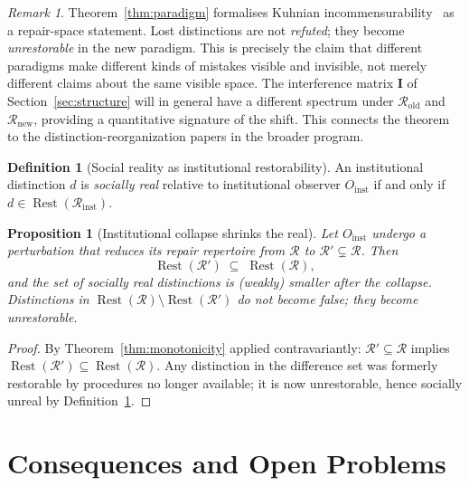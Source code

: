 \documentclass[12pt, oneside]{article}
\theoremstyle{plain}
\newtheorem{proposition}[theorem]{Proposition}
\theoremstyle{definition}
\newtheorem{definition}[theorem]{Definition}
\theoremstyle{remark}
\newtheorem{remark}[theorem]{Remark}
\theoremstyle{definition}
\DeclareMathOperator{\Rest}{Rest}
\newcommand{\IntMat}{\mathbf{I}}
\begin{document}
\begin{remark}
  Theorem~\ref{thm:paradigm} formalises Kuhnian incommensurability~\cite{Kuhn1962}
  as a repair-space statement.
  Lost distinctions are not \emph{refuted}; they become
  \emph{unrestorable} in the new paradigm.
  This is precisely the claim that different paradigms make different
  kinds of mistakes visible and invisible, not merely different claims
  about the same visible space.
  The interference matrix $\IntMat$ of Section~\ref{sec:structure}
  will in general have a different spectrum under
  $\mathcal{R}_{\mathrm{old}}$ and $\mathcal{R}_{\mathrm{new}}$,
  providing a quantitative signature of the shift.
  This connects the theorem to the distinction-reorganization papers
  in the broader program.
\end{remark}

\begin{definition}[Social reality as institutional restorability]
  An institutional distinction $d$ is \emph{socially real} relative
  to institutional observer $O_{\mathrm{inst}}$ if and only if
  $d \in \Rest(\mathcal{R}_{\mathrm{inst}})$.
  \label{def:social-reality}
\end{definition}

\begin{proposition}[Institutional collapse shrinks the real]
  Let $O_{\mathrm{inst}}$ undergo a perturbation that reduces its
  repair repertoire from $\mathcal{R}$ to $\mathcal{R}' \subsetneq
  \mathcal{R}$.
  Then
  \[
    \Rest(\mathcal{R}') \;\subseteq\; \Rest(\mathcal{R}),
  \]
  and the set of socially real distinctions is (weakly) smaller after
  the collapse.
  Distinctions in $\Rest(\mathcal{R}) \setminus \Rest(\mathcal{R}')$
  do not become false; they become unrestorable.
  \label{prop:collapse}
\end{proposition}

\begin{proof}
  By Theorem~\ref{thm:monotonicity} applied contravariantly:
  $\mathcal{R}' \subseteq \mathcal{R}$ implies
  $\Rest(\mathcal{R}') \subseteq \Rest(\mathcal{R})$.
  Any distinction in the difference set was formerly restorable
  by procedures no longer available; it is now unrestorable, hence
  socially unreal by Definition~\ref{def:social-reality}.
\end{proof}


\section{Consequences and Open Problems}
\label{sec:conclusion}
\end{document}
